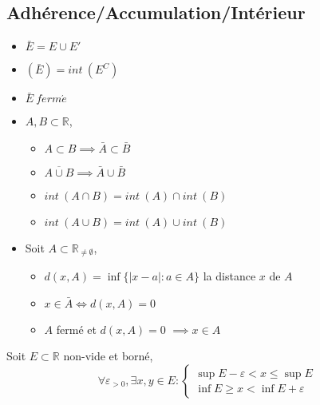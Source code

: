	\subsection*{Adhérence/Accumulation/Intérieur}
	\begin{myprop}
		\begin{itemize}
			\item $\bar{E}=E\cup E'$
			\item $(\bar{E})=int~(E^C)$
			\item $\bar{E}~ferm\acute{e}$
			\item $A,B\subset\mathbb{R}$,\begin{itemize}
				\item $A\subset B\implies \bar{A}\subset\bar{B}$
				\item $\overline{A\cup B}\implies\bar{A}\cup\bar{B}$
				\item $int~(A\cap B)=int~(A)\cap int~(B)$
				\item $int~(A\cup B)=int~(A)\cup int~(B)$ 
			\end{itemize}
			\item Soit $A\subset\mathbb{R}_{\neq\emptyset}$,\begin{itemize}
				\item $d(x,A)=\inf\{|x-a| : a\in A\}$ la distance $x$ de $A$
				\item $x\in \bar{A} \Longleftrightarrow d(x,A)=0$
				\item $A$ fermé et $d(x,A)=0$ $\implies x\in A$
			\end{itemize}
		\end{itemize}
	\end{myprop}
	\begin{myprop}
		Soit $E\subset\mathbb{R}$ non-vide et borné,
		\[\forall \varepsilon_{>0},\exists x,y\in E : \begin{cases}
		\sup E -\varepsilon <x\leq\sup E\\
		\inf E \geq x< \inf E+\varepsilon
		\end{cases}\]
	\end{myprop}